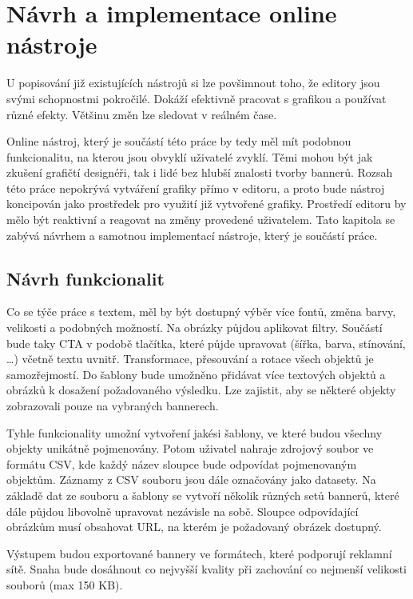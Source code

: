 \chapter{Návrh a implementace online nástroje}
\label{chap:design}
U popisování již existujících nástrojů si lze povšimnout toho, že editory jsou svými schopnostmi pokročilé.
Dokáží efektivně pracovat s grafikou a používat různé efekty. Většinu změn lze sledovat v reálném čase. 

Online nástroj, který je součástí této práce by tedy měl mít podobnou funkcionalitu, na kterou jsou obvyklí uživatelé zvyklí.
Těmi mohou být jak zkušení grafičtí designéři, tak i lidé bez hlubší znalosti tvorby bannerů.
Rozsah této práce nepokrývá vytváření grafiky přímo v editoru, a proto bude nástroj koncipován jako prostředek pro využití již vytvořené grafiky.
Prostředí editoru by mělo být reaktivní a reagovat na změny provedené uživatelem. Tato kapitola se zabývá návrhem a samotnou implementací
nástroje, který je součástí práce.

    \section{Návrh funkcionalit}\label{sec:function-design}
    Co se týče práce s textem, měl by být dostupný výběr více fontů, změna barvy, velikosti a podobných možností.
    Na obrázky půjdou aplikovat filtry. Součástí bude taky CTA v podobě tlačítka, které půjde upravovat (šířka, barva, stínování, \ldots) včetně textu uvnitř.
    Transformace, přesouvání a rotace všech objektů je samozřejmostí. Do šablony bude umožněno přidávat více textových objektů a obrázků k
    dosažení požadovaného výsledku. Lze zajistit, aby se některé objekty zobrazovali pouze na vybraných bannerech.

    Tyhle funkcionality umožní vytvoření jakési šablony, ve které budou všechny objekty unikátně pojmenovány.
    Potom uživatel nahraje zdrojový soubor ve formátu CSV, kde každý název sloupce bude odpovídat pojmenovaným objektům.
    Záznamy z CSV souboru jsou dále označovány jako datasety. Na základě dat ze souboru a šablony se vytvoří několik různých setů bannerů,
    které dále půjdou libovolně upravovat nezávisle na sobě. Sloupce odpovídající obrázkům musí obsahovat URL, na kterém je požadovaný obrázek dostupný.

    Výstupem budou exportované bannery ve formátech, které podporují reklamní sítě.
    Snaha bude dosáhnout co nejvyšší kvality při zachování co nejmenší velikosti souborů (max 150 KB). 


